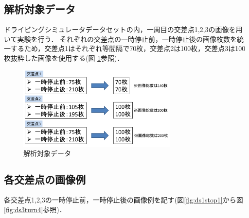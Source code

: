 \subsection{解析対象データ}
ドライビングシミュレータデータセットの内，一周目の交差点1,2,3の画像を用いて実験を行う．
それぞれの交差点の一時停止前，一時停止後の画像枚数を統一するため，交差点1はそれぞれ等間隔で70枚，交差点2は100枚，交差点3は100枚抜粋した画像を使用する(図
\ref{fig:experimentaldata1}参照)．\\

\begin{figure}[htbp]
  \begin{center}
    \includegraphics[clip,width=8.0cm]{./images/experimentaldata1.png}
    \caption{解析対象データ}
    \label{fig:experimentaldata1}
  \end{center}
\end{figure}

\subsection*{各交差点の画像例}
各交差点1,2,3の一時停止前，一時停止後の画像例を記す(図\ref{fig:ds1stop1}から図\ref{fig:ds3turn4}参照)．
    
